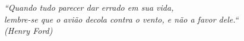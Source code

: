 \documentclass[../../layout.tex]{subfiles}
\begin{document}
\begin{epigrafe}
\vspace*{\fill}

\begin{flushright}
\textit{``Quando tudo parecer dar errado em sua vida,\\
	lembre-se que o avião decola contra o vento, e não a favor dele.``\\
	(Henry Ford)
}
\end{flushright}

\end{epigrafe}
\end{document}
